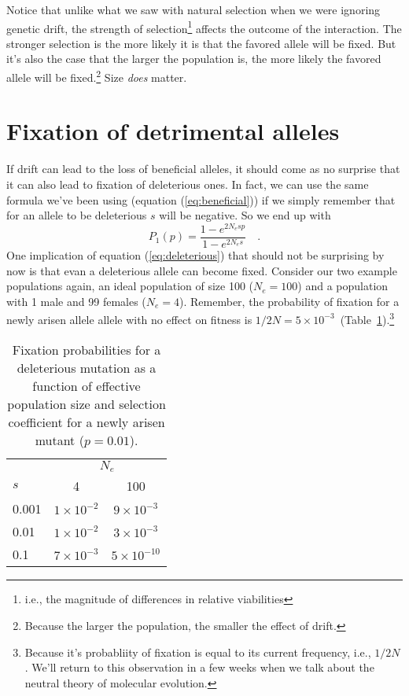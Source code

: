 \documentclass[12pt]{article}
\begin{document}
Notice that unlike what we saw with natural selection when we were
ignoring genetic drift, the strength of selection\footnote{i.e., the
  magnitude of differences in relative viabilities} affects the
outcome of the interaction. The stronger selection is the more likely
it is that the favored allele will be fixed. But it's also the case
that the larger the population is, the more likely the favored allele
will be fixed.\footnote{Because the larger the population, the smaller
  the effect of drift.} Size {\it does\/} matter.

\section*{Fixation of detrimental alleles}

If drift can lead to the loss of beneficial alleles, it should come as
no surprise that it can also lead to fixation of deleterious ones. In
fact, we can use the same formula we've been using (equation
(\ref{eq:beneficial})) if we simply remember that for an allele to be
deleterious $s$ will be negative. So we end up with
\begin{equation}
P_1(p) = \frac{1 - e^{2N_esp}}{1 - e^{2N_es}} \quad .
\label{eq:deleterious}
\end{equation}
One implication of equation (\ref{eq:deleterious}) that should not be
surprising by now is that evan a deleterious allele can become
fixed. Consider our two example populations again, an ideal population
of size 100 ($N_e = 100$) and a population with 1 male and 99 females
($N_e = 4$). Remember, the probability of fixation for a newly arisen
allele allele with no effect on fitness is $1/2N = 5 \times
10^{-3}$~(Table~\ref{table:fixation}).\footnote{Because it's
  probabliity of fixation is equal to its current frequency, i.e.,
  $1/2N$. We'll return to this observation in a few weeks when we talk
  about the neutral theory of molecular evolution.}

\begin{table}
\begin{center}
\begin{tabular}{l|cc}
\hline\hline
      & \multicolumn{2}{c}{$N_e$} \\
$s$   & 4                  & 100 \\
\hline
0.001 & $1 \times 10^{-2}$ & $9 \times 10^{-3}$ \\
0.01  & $1 \times 10^{-2}$ & $3 \times 10^{-3}$ \\
0.1   & $7 \times 10^{-3}$ & $5 \times 10^{-10}$ \\
\hline
\end{tabular}
\end{center}
\caption{Fixation probabilities for a deleterious mutation as a
function of effective population size and selection coefficient for a
newly arisen mutant ($p=0.01$).}\label{table:fixation}
\end{table}
\end{document}
